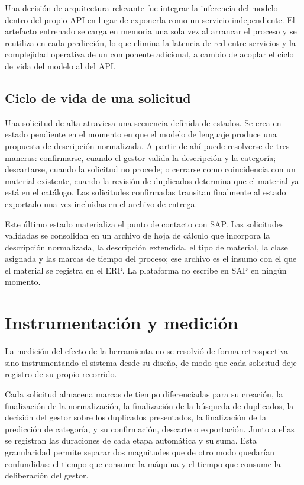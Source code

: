 Una decisión de arquitectura relevante fue integrar la inferencia del modelo dentro del propio API en lugar de exponerla como un servicio independiente. El artefacto entrenado se carga en memoria una sola vez al arrancar el proceso y se reutiliza en cada predicción, lo que elimina la latencia de red entre servicios y la complejidad operativa de un componente adicional, a cambio de acoplar el ciclo de vida del modelo al del API.

\subsection{Ciclo de vida de una solicitud}
Una solicitud de alta atraviesa una secuencia definida de estados. Se crea en estado pendiente en el momento en que el modelo de lenguaje produce una propuesta de descripción normalizada. A partir de ahí puede resolverse de tres maneras: confirmarse, cuando el gestor valida la descripción y la categoría; descartarse, cuando la solicitud no procede; o cerrarse como coincidencia con un material existente, cuando la revisión de duplicados determina que el material ya está en el catálogo. Las solicitudes confirmadas transitan finalmente al estado exportado una vez incluidas en el archivo de entrega.

Este último estado materializa el punto de contacto con SAP. Las solicitudes validadas se consolidan en un archivo de hoja de cálculo que incorpora la descripción normalizada, la descripción extendida, el tipo de material, la clase asignada y las marcas de tiempo del proceso; ese archivo es el insumo con el que el material se registra en el ERP. La plataforma no escribe en SAP en ningún momento.

\section{Instrumentación y medición}
La medición del efecto de la herramienta no se resolvió de forma retrospectiva sino instrumentando el sistema desde su diseño, de modo que cada solicitud deje registro de su propio recorrido.

Cada solicitud almacena marcas de tiempo diferenciadas para su creación, la finalización de la normalización, la finalización de la búsqueda de duplicados, la decisión del gestor sobre los duplicados presentados, la finalización de la predicción de categoría, y su confirmación, descarte o exportación. Junto a ellas se registran las duraciones de cada etapa automática y su suma. Esta granularidad permite separar dos magnitudes que de otro modo quedarían confundidas: el tiempo que consume la máquina y el tiempo que consume la deliberación del gestor.

